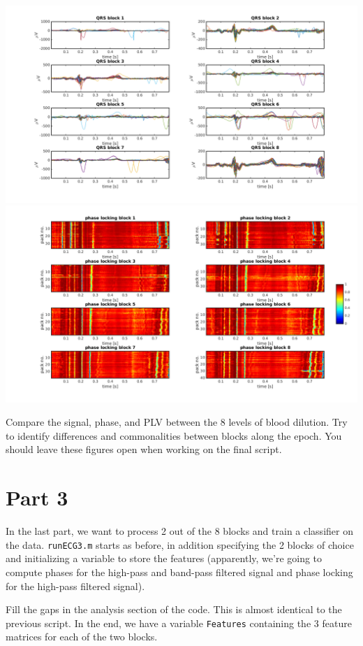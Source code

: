 \documentclass[10pt,a4paper,notitlepage]{report}
\begin{document}
\hspace{-1cm} \includegraphics[scale=0.25]{p2fig9.png}
\includegraphics[scale=0.25]{p2fig10.png}
\vspace{5mm}

Compare the signal, phase, and PLV between the 8 levels of blood dilution. Try to identify differences and commonalities between blocks along the epoch. You should leave these figures open when working on the final script.


\section*{Part 3}
In the last part, we want to process 2 out of the 8 blocks and train a classifier on the data. \texttt{runECG3.m} starts as before, in addition specifying the 2 blocks of choice and initializing a variable to store the features (apparently, we're going to compute phases for the high-pass and band-pass filtered signal and phase locking for the high-pass filtered signal).

Fill the gaps in the analysis section of the code. This is almost identical to the previous script. In the end, we have a variable \texttt{Features} containing the 3 feature matrices for each of the two blocks.
\end{document}
